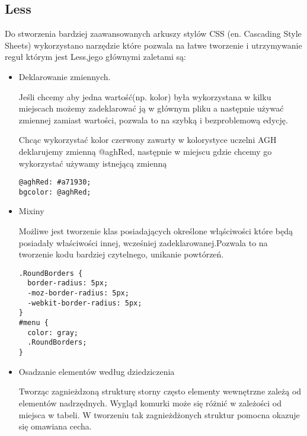 \subsection{Less}
\label{sec:less}

Do stworzenia bardziej zaawansowanych arkuszy stylów CSS (en. Cascading Style Sheets) wykorzystano narzędzie które pozwala na łatwe tworzenie i utrzymywanie reguł którym jest Less,jego głównymi zaletami są:

\begin{itemize}
\item
Deklarowanie zmiennych.

Jeśli chcemy aby jedna wartość(np. kolor) była wykorzystana w kilku miejscach możemy zadeklarować ją w głównym pliku  a następnie używać zmiennej zamiast wartości, pozwala to na szybką i bezproblemową edycję.

Chcąc wykorzystać kolor czerwony zawarty w kolorystyce uczelni AGH deklarujemy zmienną @aghRed, następnie w miejscu gdzie chcemy go wykorzystać używamy istnejącą zmienną

\lstset{language=JavaScript}
\label{lis:webSql}
\begin{lstlisting}[caption=json]
@aghRed: #a71930;
bgcolor: @aghRed;
\end{lstlisting}

\item
Mixiny

Możliwe jest tworzenie klas posiadających określone włąściwości które będą posiadały właściwości innej, wcześniej zadeklarowanej.Pozwala to na tworzenie kodu bardziej czytelnego, unikanie powtórzeń.


\lstset{language=JavaScript}
\label{lis:webSql}
\begin{lstlisting}[caption=json]
.RoundBorders {
  border-radius: 5px;
  -moz-border-radius: 5px;
  -webkit-border-radius: 5px;
}
#menu {
  color: gray;
  .RoundBorders;
}
\end{lstlisting}

\item
Osadzanie elementów według dziedziczenia

Tworząc zagnieżdzoną strukturę storny często elementy wewnętrzne zależą od elementów nadrzędnych. Wygląd komurki może się różnić w zależości od miejsca w tabeli. W tworzeniu tak zagnieżdżonych struktur pomocna okazuje się omawiana cecha.

\end{itemize}
